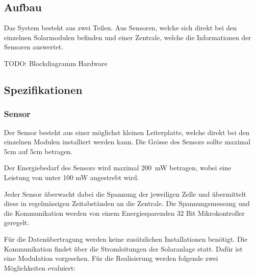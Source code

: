 \subsection{Aufbau}

Das System besteht  aus zwei Teilen. Aus Sensoren, welche sich  direkt bei den
einzelnen Solarmodulen  befinden und einer Zentrale,  welche die Informationen
der Sensoren auswertet.

\textsc{TODO}: Blockdiagramm Hardware


\subsection{Spezifikationen}


\subsubsection{Sensor}

Der Sensor besteht  aus einer m\"oglichst kleinen  Leiterplatte, welche direkt
bei den  einzelnen Modulen installiert  werden kann. Die Gr\"osse  des Sensors
sollte maximal 5cm auf 5cm betragen.

Der  Energiebedarf des  Sensors wird  maximal \SI{200}{\milli\watt}  betragen,
wobei eine Leistung von unter 100 mW angestrebt wird.

Jeder  Sensor  \"uberwacht  dabei  die   Spannung  der  jeweiligen  Zelle  und
\"ubermittelt diese  in regelm\"assigen  Zeitabst\"anden an  die Zentrale. Die
Spannungsmessung und  die Kommunikation  werden von einem  Energiesparenden 32
Bit Mikrokontroller geregelt.

F\"ur  die  Daten\"ubertragung   werden  keine  zus\"atzlichen  Installationen
ben\"otigt. Die Kommunikation findet \"uber die Stromleitungen der Solaranlage
statt. Daf\"ur ist  eine Modulation vorgesehen. F\"ur die  Realisierung werden
folgende zwei M\"oglichkeiten evaluiert:

